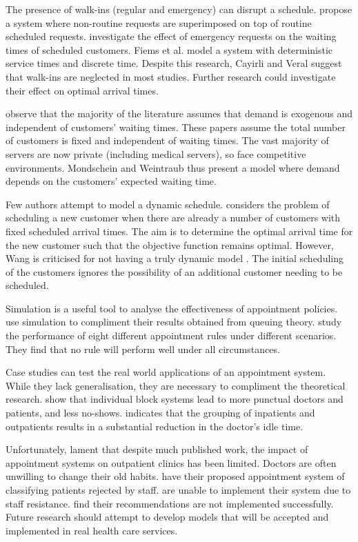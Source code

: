 The presence of walk-ins (regular and emergency) can disrupt a schedule. \citet{Gupta} propose a system where non-routine requests are superimposed on top of routine scheduled requests. \citet{Fiems} investigate the effect of emergency requests on the waiting times of scheduled customers. Fiems et al. model a system with deterministic service times and discrete time. Despite this research, Cayirli and Veral suggest that walk-ins are neglected in most studies. Further research could investigate their effect on optimal arrival times.

\citet{Mondschein} observe that the majority of the literature assumes that demand is exogenous and independent of customers' waiting times. These papers assume the total number of customers is fixed and independent of waiting times. The vast majority of servers are now private (including medical servers), so face competitive environments. Mondschein and Weintraub thus present a model where demand depends on the customers' expected waiting time.

Few authors attempt to model a dynamic schedule. \citet{Wang} considers the problem of scheduling a new customer when there are already a number of customers with fixed scheduled arrival times. The aim is to determine the optimal arrival time for the new customer such that the objective function remains optimal. However, Wang is criticised for not having a truly dynamic model \citep{Erdogan}. The initial scheduling of the customers ignores the possibility of an additional customer needing to be scheduled.

Simulation is a useful tool to analyse the effectiveness of appointment policies. \citet{Kao} use simulation to compliment their results obtained from queuing theory. \citet{Ho} study the performance of eight different appointment rules under different scenarios. They find that no rule will perform well under all circumstances.

Case studies can test the real world applications of an appointment system. While they lack generalisation, they are necessary to compliment the theoretical research. \citet{Rockart} show that individual block systems lead to more punctual doctors and patients, and less no-shows. \citet{Walter} indicates that the grouping of inpatients and outpatients results in a substantial reduction in the doctor's idle time.

Unfortunately, \citet{Cayirli} lament that despite much published work, the impact of appointment systems on outpatient clinics has been limited. Doctors are often unwilling to change their old habits. \citet{O'Keefe} have their proposed appointment system of classifying patients rejected by staff. \citet{Huarng} are unable to implement their system due to staff resistance. \citet{Bennett} find their recommendations are not implemented successfully. Future research should attempt to develop models that will be accepted and implemented in real health care services.
